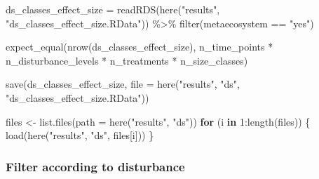 \documentclass[
]{article}
\newenvironment{Shaded}{\begin{snugshade}}{\end{snugshade}}
\newcommand{\AttributeTok}[1]{\textcolor[rgb]{0.77,0.63,0.00}{#1}}
\newcommand{\ControlFlowTok}[1]{\textcolor[rgb]{0.13,0.29,0.53}{\textbf{#1}}}
\newcommand{\DecValTok}[1]{\textcolor[rgb]{0.00,0.00,0.81}{#1}}
\newcommand{\FunctionTok}[1]{\textcolor[rgb]{0.00,0.00,0.00}{#1}}
\newcommand{\NormalTok}[1]{#1}
\newcommand{\OtherTok}[1]{\textcolor[rgb]{0.56,0.35,0.01}{#1}}
\newcommand{\SpecialCharTok}[1]{\textcolor[rgb]{0.00,0.00,0.00}{#1}}
\newcommand{\StringTok}[1]{\textcolor[rgb]{0.31,0.60,0.02}{#1}}
\begin{document}
\begin{Shaded}
\begin{Highlighting}[]
\NormalTok{ds\_classes\_effect\_size }\OtherTok{=} \FunctionTok{readRDS}\NormalTok{(}\FunctionTok{here}\NormalTok{(}\StringTok{"results"}\NormalTok{, }\StringTok{"ds\_classes\_effect\_size.RData"}\NormalTok{)) }\SpecialCharTok{\%\textgreater{}\%}
  \FunctionTok{filter}\NormalTok{(metaecosystem }\SpecialCharTok{==} \StringTok{"yes"}\NormalTok{)}

\FunctionTok{expect\_equal}\NormalTok{(}\FunctionTok{nrow}\NormalTok{(ds\_classes\_effect\_size),}
\NormalTok{             n\_time\_points }\SpecialCharTok{*}\NormalTok{ n\_disturbance\_levels }\SpecialCharTok{*}\NormalTok{ n\_treatments }\SpecialCharTok{*}\NormalTok{ n\_size\_classes)}
\end{Highlighting}
\end{Shaded}

\begin{Shaded}
\begin{Highlighting}[]
\FunctionTok{save}\NormalTok{(ds\_classes\_effect\_size, }\AttributeTok{file =} \FunctionTok{here}\NormalTok{(}\StringTok{"results"}\NormalTok{, }\StringTok{"ds"}\NormalTok{, }\StringTok{"ds\_classes\_effect\_size.RData"}\NormalTok{))}
\end{Highlighting}
\end{Shaded}

\begin{Shaded}
\begin{Highlighting}[]
\NormalTok{files }\OtherTok{\textless{}{-}} \FunctionTok{list.files}\NormalTok{(}\AttributeTok{path =} \FunctionTok{here}\NormalTok{(}\StringTok{"results"}\NormalTok{, }\StringTok{"ds"}\NormalTok{))}
\ControlFlowTok{for}\NormalTok{ (i }\ControlFlowTok{in} \DecValTok{1}\SpecialCharTok{:}\FunctionTok{length}\NormalTok{(files)) \{}
  \FunctionTok{load}\NormalTok{(}\FunctionTok{here}\NormalTok{(}\StringTok{"results"}\NormalTok{, }\StringTok{"ds"}\NormalTok{, files[i]))}
\NormalTok{\}}
\end{Highlighting}
\end{Shaded}

\hypertarget{filter-according-to-disturbance}{%
\subsubsection{Filter according to
disturbance}\label{filter-according-to-disturbance}}
\end{document}
